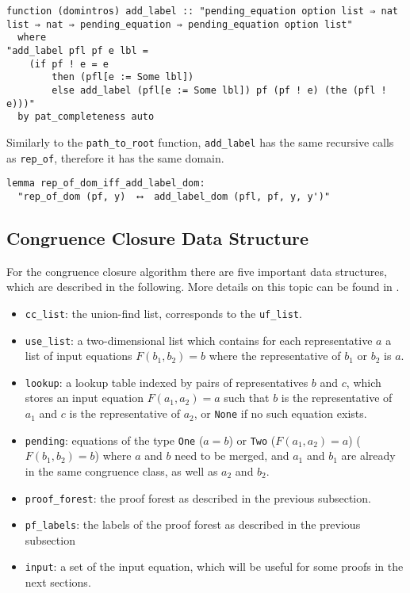 \begin{lstlisting}
function (domintros) add_label :: "pending_equation option list ⇒ nat list ⇒ nat ⇒ pending_equation ⇒ pending_equation option list"
  where
"add_label pfl pf e lbl =
    (if pf ! e = e
        then (pfl[e := Some lbl])
        else add_label (pfl[e := Some lbl]) pf (pf ! e) (the (pfl ! e)))"
  by pat_completeness auto
\end{lstlisting}

Similarly to the \lstinline{path_to_root} function, \lstinline{add_label} has the same recursive calls as \lstinline{rep_of}, therefore it has the same domain.

\begin{lstlisting}
lemma rep_of_dom_iff_add_label_dom:
  "rep_of_dom (pf, y)  ⟷  add_label_dom (pfl, pf, y, y')"
\end{lstlisting}

\subsection{Congruence Closure Data Structure}
\label{subsection:datastructure}

For the congruence closure algorithm there are five important data structures, which are described in the following. More details on this topic can be found in \cite{Nieuwenhuis}.

\begin{itemize}
	\item \lstinline{cc_list}: the union-find list, corresponds to the \lstinline{uf_list}.

	\item \lstinline{use_list}: a two-dimensional list which contains for each representative $a$ a list of input equations $F(b_1, b_2) = b$ where the representative of $b_1$ or $b_2$ is $a$.

	\item \lstinline{lookup}: a lookup table indexed by pairs of representatives $b$ and $c$, which stores an input equation $F(a_1, a_2) = a$ such that $b$ is the representative of $a_1$ and $c$ is the representative of $a_2$, or \lstinline{None} if no such equation exists.

    \item \lstinline{pending}: equations of the type \lstinline{One} ($a = b$) or \lstinline{Two} ($F(a_1, a_2) = a$) ($F(b_1, b_2) = b$) where $a$ and $b$ need to be merged, and $a_1$ and $b_1$ are already in the same congruence class, as well as $a_2$ and $b_2$.

    \item \lstinline{proof_forest}: the proof forest as described in the previous subsection.

    \item \lstinline{pf_labels}: the labels of the proof forest as described in the previous subsection

    \item \lstinline{input}: a set of the input equation, which will be useful for some proofs in the next sections.
\end{itemize}


